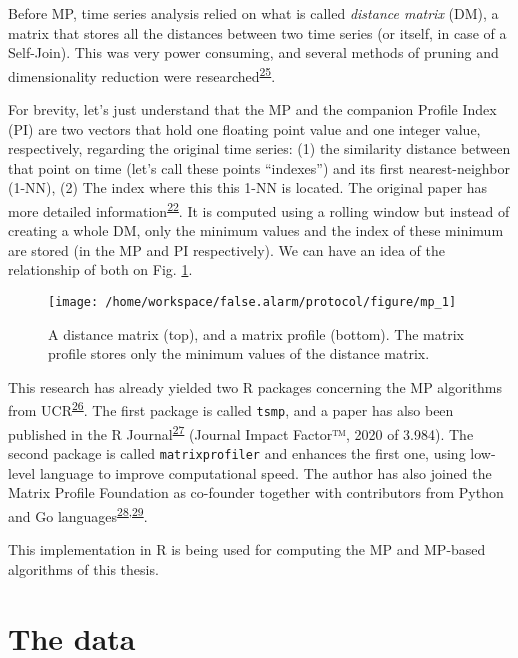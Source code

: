 \documentclass[12pt,twoside]{fmupthesis}
\begin{document}
Before MP, time series analysis relied on what is called \emph{distance matrix} (DM), a matrix that stores all
the distances between two time series (or itself, in case of a Self-Join). This was very power consuming,
and several methods of pruning and dimensionality reduction were researched\textsuperscript{\protect\hyperlink{ref-Lin2007}{25}}.

For brevity, let's just understand that the MP and the companion Profile Index (PI) are two vectors
that hold one floating point value and one integer value, respectively, regarding the original time
series: (1) the similarity distance between that point on time (let's call these points ``indexes'')
and its first nearest-neighbor (1-NN), (2) The index where this this 1-NN is located. The original
paper has more detailed information\textsuperscript{\protect\hyperlink{ref-Yeh2017a}{22}}. It is computed using a rolling window but instead
of creating a whole DM, only the minimum values and the index of these minimum are stored (in the
MP and PI respectively). We can have an idea of the relationship of both on Fig. \ref{fig:thematrix}.
\begin{figure}

{\centering \texttt{[image: /home/workspace/false.alarm/protocol/figure/mp\_1]} 

}

\caption{A distance matrix (top), and a matrix profile (bottom). The matrix profile stores only the minimum values of the distance matrix.}\label{fig:thematrix}
\end{figure}
This research has already yielded two R packages concerning the MP algorithms from UCR\textsuperscript{\protect\hyperlink{ref-mpucr}{26}}. The
first package is called \texttt{tsmp}, and a paper has also been published in the R Journal\textsuperscript{\protect\hyperlink{ref-RJ-2020-021}{27}}
(Journal Impact Factor™, 2020 of 3.984). The second package is called \texttt{matrixprofiler} and enhances
the first one, using low-level language to improve computational speed. The author has also joined
the Matrix Profile Foundation as co-founder together with contributors from Python and Go languages\textsuperscript{\protect\hyperlink{ref-mpf2020}{28},\protect\hyperlink{ref-VanBenschoten2020}{29}}.

This implementation in R is being used for computing the MP and MP-based algorithms of this thesis.

\hypertarget{the-data}{%
\section{The data}\label{the-data}}
\end{document}
